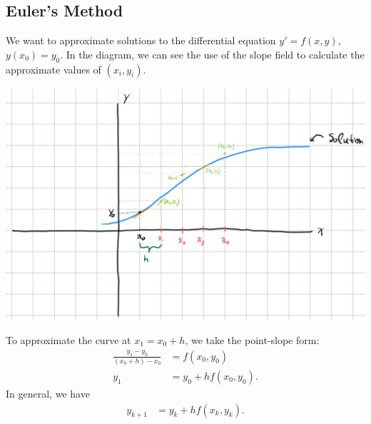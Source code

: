 \documentclass[10pt]{mypackage}
\begin{document}
\subsection{Euler's Method}%
We want to approximate solutions to the differential equation $y' = f(x,y)$, $y(x_0) = y_0$. In the diagram, we can see the use of the slope field to calculate the approximate values of $\left(x_i,y_i\right)$.
\begin{center}
  \includegraphics[width=15cm]{images/eulers_method_1.png}
\end{center}
\begin{method}
  To approximate the curve at $x_1 = x_0 + h$, we take the point-slope form:
  \begin{align*}
    \frac{y_1 - y_0}{\left(x_0 + h\right)-x_0} &= f\left(x_0,y_0\right)\\
    y_1 &= y_0 + hf\left(x_0,y_0\right).
  \end{align*}
  In general, we have
  \begin{align*}
    y_{k+1} &= y_k + hf\left(x_k,y_k\right).
  \end{align*}
\end{method}
\end{document}
